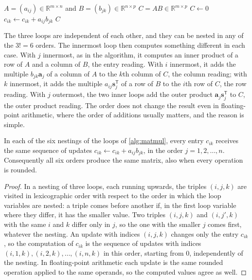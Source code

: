 \begin{algorithm}
\begin{algorithmic}[1]
\Require $A=(a_{ij})\in\mathbb R^{m\times n}$ and $B=(b_{jk})\in\mathbb R^{n\times p}$
\Ensure $C=AB\in\mathbb R^{m\times p}$
\State $C\gets0$ 
      \State $c_{ik}\gets c_{ik}+a_{ij}b_{jk}$
    \EndFor
  \EndFor
\EndFor
\State \Return $C$
\end{algorithmic}
\caption{The matrix product by three nested loops, in the order $i,k,j$. The three \textbf{for} lines may be arranged in any of the six possible orders without changing the result (\cref{prop:loop-orders}). The cost is $mnp$ multiplications and as many additions.}
\label{alg:matmul}
\end{algorithm}

The three loops are independent of each other, and they can be nested in any of the $3!=6$ orders. The innermost loop then computes something different in each case. With $j$ innermost, as in the algorithm, it computes an inner product of a row of $A$ and a column of $B$, the entry reading. With $i$ innermost, it adds the multiple $b_{jk}\mathbf a_j$ of a column of $A$ to the $k$th column of $C$, the column reading; with $k$ innermost, it adds the multiple $a_{ij}\mathbf s_j^{\mathsf T}$ of a row of $B$ to the $i$th row of $C$, the row reading. With $j$ outermost, the two inner loops add the outer product $\mathbf a_j\mathbf s_j^{\mathsf T}$ to $C$, the outer product reading. The order does not change the result even in floating-point arithmetic, where the order of additions usually matters, and the reason is simple.

\begin{proposition}
\label{prop:loop-orders}
In each of the six nestings of the loops of \cref{alg:matmul}, every entry $c_{ik}$ receives the same sequence of updates $c_{ik}\gets c_{ik}+a_{ij}b_{jk}$, in the order $j=1,2,\ldots,n$. Consequently all six orders produce the same matrix, also when every operation is rounded.
\end{proposition}

\begin{proof}
In a nesting of three loops, each running upwards, the triples $(i,j,k)$ are visited in lexicographic order with respect to the order in which the loop variables are nested: a triple comes before another if, in the first loop variable where they differ, it has the smaller value. Two triples $(i,j,k)$ and $(i,j',k)$ with the same $i$ and $k$ differ only in $j$, so the one with the smaller $j$ comes first, whatever the nesting. An update with indices $(i,j,k)$ changes only the entry $c_{ik}$, so the computation of $c_{ik}$ is the sequence of updates with indices $(i,1,k),(i,2,k),\ldots,(i,n,k)$ in this order, starting from $0$, independently of the nesting. In floating-point arithmetic each update is the same rounded operation applied to the same operands, so the computed values agree as well.
\end{proof}

